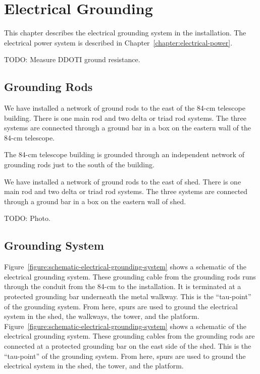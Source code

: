\chapter{Electrical Grounding}
\label{chapter:electrical-grounding}

This chapter describes the electrical grounding system in the {\projectname} installation. The electrical power system is described in Chapter~\ref{chapter:electrical-power}.

TODO: Measure DDOTI ground resistance.

\section{Grounding Rods}

\ifcoatli
We have installed a network of ground rods to the 
east of the 84-cm telescope building. There is one main rod and two delta or triad rod systems. The three systems are connected through a ground bar in a box on the eastern wall of the 84-cm telescope.

The 84-cm telescope building is grounded through an independent network of grounding rods just to the south of the building.
\fi

\ifddoti
We have installed a network of ground rods to the 
east of shed. There is one main rod and two delta or triad rod systems. The three systems are connected through a ground bar in a box on the eastern wall of shed.
\fi

TODO: Photo.


\section{Grounding System}

\ifcoatli
Figure~\ref{figure:schematic-electrical-grounding-system} shows a schematic of the electrical grounding system. These grounding cable from the grounding rods runs through the conduit from the 84-cm to the {\projectname} installation. It is terminated at a protected grounding bar underneath the metal walkway. This is the “tau-point” of the grounding system. From here, spurs are used to ground the electrical system in the shed, the walkways, the tower, and the platform.
\fi
\ifddoti
Figure~\ref{figure:schematic-electrical-grounding-system} shows a schematic of the electrical grounding system. These grounding cables from the grounding rods are connected at a protected grounding bar on the east side of the shed. This is the “tau-point” of the grounding system. From here, spurs are used to ground the electrical system in the shed, the tower, and the platform.
\fi

